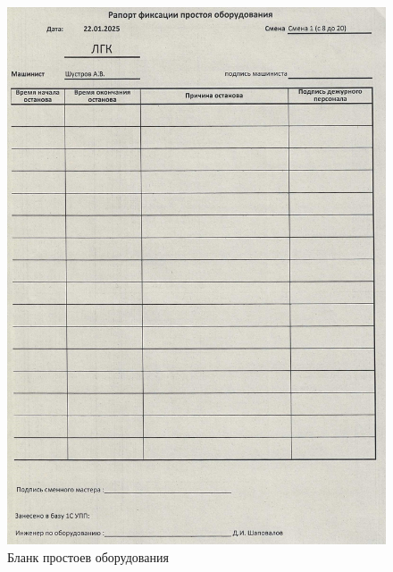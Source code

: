 \newpage
\begin{figure}
\begin{center}
 \includegraphics[height=0.9\textheight, keepaspectratio]{Pics/V.9.jpg}
\end{center}
 \caption{Бланк простоев оборудования}
 \label{pic:V.9}
\end{figure}

